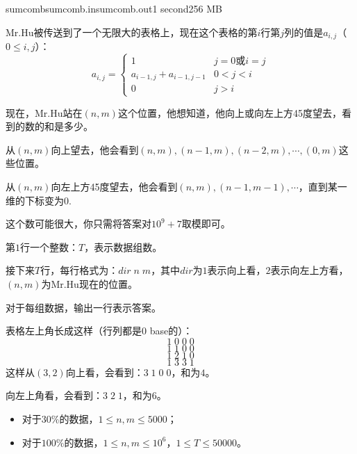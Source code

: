 \documentclass[11pt,a4paper,oneside]{article}
\begin{document}
\begin{problem}{sumcomb}{sumcomb.in}{sumcomb.out}{1 second}{256 MB}
	
	Mr.Hu被传送到了一个无限大的表格上，现在这个表格的第$i$行第$j$列的值是$a_{i,j}$（$0 \leq i, j$）：
	$$
		a_{i,j} = 
		\begin{cases}
			1 & j = 0 \text{或} i = j \\
			a_{i-1,j} + a_{i-1,j-1} & 0 < j < i \\
			0 & j > i
		\end{cases}
	$$
	
	现在，Mr.Hu站在$(n,m)$这个位置，他想知道，他向上或向左上方45度望去，看到的数的和是多少。
	
	从$(n,m)$向上望去，他会看到$(n,m),(n-1,m),(n-2,m),\cdots,(0,m)$这些位置。
	
	从$(n,m)$向左上方45度望去，他会看到$(n,m),(n-1,m-1),\cdots$，直到某一维的下标变为0.
	
	这个数可能很大，你只需将答案对$10^9 + 7$取模即可。
	
	\InputFile
	
	第$1$行一个整数：$T$，表示数据组数。
	
	接下来$T$行，每行格式为：$dir \; n \; m$，其中$dir$为$1$表示向上看，$2$表示向左上方看，$(n,m)$为Mr.Hu现在的位置。
	
	\OutputFile
	
	对于每组数据，输出一行表示答案。
	
	\Example
	
	\begin{example}
	\end{example}
	
	表格左上角长成这样（行列都是0 base的）：
	$$
		1 \; 0 \; 0 \; 0
	$$
	$$
		1 \; 1 \; 0 \; 0
	$$
	$$
		1 \; 2 \; 1 \; 0
	$$
	$$
		1 \; 3 \; 3 \; 1
	$$
	这样从$(3,2)$向上看，会看到：$3 \; 1 \; 0 \; 0$，和为$4$。
	
	向左上角看，会看到：$3 \; 2 \; 1$，和为$6$。
	
	\Note

	\begin{itemize}
		\item 对于$30\%$的数据，$1 \leq n, m \leq 5000$；
		\item 对于$100\%$的数据，$1 \leq n, m \leq 10^6$，$1 \leq T \leq 50000$。
	\end{itemize}

\end{problem}
\end{document}
